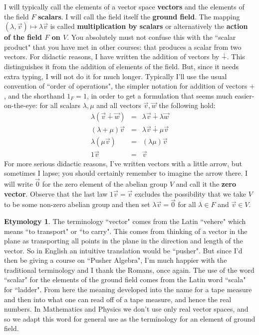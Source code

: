 \documentclass[11pt]{amsbook}
\theoremstyle{definition}
\newtheorem*{etym}{Etymology}
\begin{document}
I will typically call the elements of a vector space {\bf vectors} and the elements of the field $F$ {\bf scalars}. I will call the field itself the {\bf ground field}. The mapping $(\lambda, \vec{v}) \mapsto \lambda \vec{v}$ is called {\bf multiplication by scalars} or alternatively the {\bf action of the field $F$ on $V$}. You absolutely must not confuse this with the ``scalar product" that you have met in other courses: that produces a scalar from two vectors. For didactic reasons, I have written the addition of vectors by $\dotplus$. This distinguishes it from the addition of elements of the field. But, since it needs extra typing, I will not do it for much longer. Typically I'll use the usual convention of ``order of operations", the simpler notation for addition of vectors $+$, and the shorthand $1_F = 1$, in order to get a formulation that seems much easier-on-the-eye: for all scalars $\lambda, \mu$ and all vectors $\vec{v}, \vec{w}$ the following hold:
\begin{eqnarray*}
\lambda (\vec{v}\dotplus \vec{w}) &=& \lambda \vec{v} \dotplus\lambda \vec{w} \\ (\lambda + \mu) \vec{v} &=& \lambda \vec{v} \dotplus\mu \vec{v} \\ \lambda( \mu \vec{v}) &=& (\lambda \mu) \vec{v} \\ 1 \vec{v} &=& \vec{v}
\end{eqnarray*}
For more serious didactic reasons, I've written vectors with a little arrow, but sometimes I lapse; you should certainly remember to imagine the arrow there. I will write $\vec{0}$ for the zero element of the  abelian group $V$ and call it the {\bf zero vector}. Observe that the last law $1 \vec{v} =  \vec{v}$ excludes the possibility that we take $V$ to be some non-zero abelian group and then set $\lambda  \vec{v} = \vec{0}$ for all $\lambda \in F$ and $ \vec{v} \in V$.

\begin{etym} \label{pusher} The terminology ``vector" comes from the Latin ``vehere" which means ``to transport" or ``to carry". This comes from thinking of a vector in the plane as transporting all points in the plane in the direction and length of the vector. So in English an intuitive translation would be ``pusher". But since I'd then be giving a course on ``Pusher Algebra", I'm much happier with the traditional terminology and I thank the Romans, once again. The use of the word ``scalar" for the elements of the ground field comes from the Latin word ``scala" for ``ladder". From here the meaning developed into the name for a tape measure and then into what one can read off of a tape measure, and hence the real numbers. In Mathematics and Physics we don't use only real vector spaces, and so we adapt this word for general use as the terminology for an element of ground field.
\end{etym}
\medskip
\end{document}
